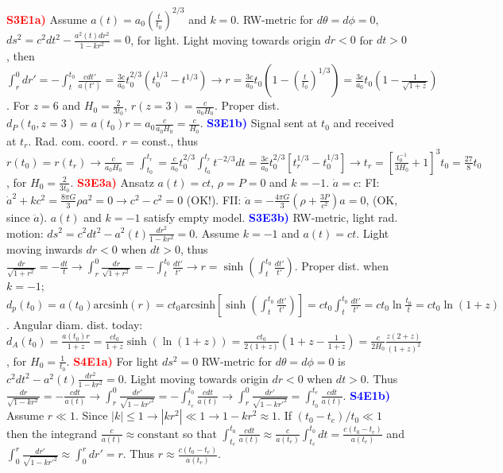 \documentclass[landscape, a4paper,1pt,english]{article}
\begin{document}
{{{\begin{multicols}{5}
\textcolor{red}{\textbf{S3E1a)}} Assume $a(t) = a_0 \left(\frac{t}{t_0}\right)^{2/3}$ and $k=0$. RW-metric for $d\theta = d\phi = 0$, $ds^2 = c^2dt^2 -\frac{a^2(t)dr^2}{1-kr^2} = 0$, for light. Light moving towards origin $dr<0$ for $dt >0$, then $\int_{r}^{0}dr' = -\int_{t}^{t_0}\frac{cdt'}{a(t')} = \frac{3c}{a_0}t_0^{2/3}(t_0^{1/3} - t^{1/3}) \rightarrow r = \frac{3c}{a_0}t_0\left(1-\left(\frac{t}{t_0}\right)^{1/3}\right) = \frac{3c}{a_0}t_0(1-\frac{1}{\sqrt{1+z}})  $. For $z = 6$ and $H_0  = \frac{2}{3t_0}$, $r(z = 3) = \frac{c}{a_0H_0}$. Proper dist. $d_P(t_0,z=3) = a(t_0)r = a_0\frac{c}{a_0H_0} = \frac{c}{H_0}$.
\textcolor{blue}{\textbf{S3E1b)}} Signal sent at $t_0$ and received at $t_r$. Rad. com. coord. $r=\text{const.}$, thus $r(t_0) = r(t_r)\rightarrow\frac{c}{a_0H_0} = \int_{t_0}^{t_r} = \frac{c}{a_0}t_0^{2/3}\int_{t_0}^{t_r}t^{-2/3}dt = \frac{3c}{a_0}t_0^{2/3}[t_r^{1/3} - t_0^{1/3}]\rightarrow t_r = \left[\frac{t_0^{-1}}{3H_0}+1\right]^3t_0 = \frac{27}{8}t_0$, for $H_0 = \frac{2}{3t_0}$.
\textcolor{red}{\textbf{S3E3a)}} Ansatz $a(t)=ct$, $\rho = P = 0$ and $k=-1$. $\dot{a} = c$: FI: $\dot{a}^2 + kc^2 = \frac{8\pi G}{3}\rho a^2 = 0\rightarrow c^2-c^2 = 0$ (OK!). FII: $\ddot{a} = -\frac{4\pi G}{3}(\rho+\frac{3P}{c^2})a = 0$, (OK, since $\ddot{a}$). $a(t)$ and $k=-1$ satisfy empty model.
\textcolor{blue}{\textbf{S3E3b)}} RW-metric, light rad. motion: $ds^2 = c^2dt^2 - a^2(t)\frac{dr^2}{1-kr^2}=0$. Assume $k=-1$ and $a(t) = ct$. Light moving inwards $dr<0$ when $dt>0$, thus $\frac{dr}{\sqrt{1+r^2}} = -\frac{dt}{t}\rightarrow \int_{r}^{0}\frac{dr}{\sqrt{1+r^2}} = -\int_{t}^{t_0}\frac{dt'}{t'} \rightarrow r = \sinh(\int_{t}^{t_0}\frac{dt'}{t'})$. Proper dist. when $k=-1$; $d_p(t_0) = a(t_0)\text{arcsinh}(r) = ct_0\text{arcsinh}\left[\sinh\left(\int_{t}^{t_0}\frac{dt'}{t'}\right)\right] = ct_0\int_{t}^{t_0}\frac{dt'}{t'} = ct_0\ln\frac{t_0}{t} = ct_0\ln(1+z)$. Angular diam. dist. today: $d_A(t_0) = \frac{a(t_0)r}{1+z} = \frac{ct_0}{1+z}\sinh(\ln(1+z)) = \frac{ct_0}{2(1+z)}\left(1+z - \frac{1}{1+z}\right) = \frac{c}{2H_0}\frac{z(2+z)}{(1+z)^2}$, for $H_0 = \frac{1}{t_0}$.
\textcolor{red}{\textbf{S4E1a)}} For light $ds^2 = 0$ RW-metric for $d\theta = d\phi = 0$ is $c^2dt^2 - a^2(t)\frac{dr^2}{1-kr^2} = 0$. Light moving towards origin $dr<0$ when $dt>0$. Thus $\frac{dr}{\sqrt{1-kr^2}} = -\frac{cdt}{a(t)}\rightarrow \int_{r}^{0}\frac{dr'}{\sqrt{1-kr'^2}} = -\int_{t_e}^{t_0}\frac{cdt}{a(t)}\rightarrow\int_{r}^{0}\frac{dr'}{\sqrt{1-kr'^2}} = \int_{t_0}^{t_e}\frac{cdt}{a(t)}$.
\textcolor{blue}{\textbf{S4E1b)}} Assume $r\ll1$. Since $|k|\leq 1\rightarrow |kr^2|\ll1\rightarrow 1-kr^2\approx 1$. If $(t_0-t_e)/t_0\ll1$ then the integrand $\frac{c}{a(t)}\approx\text{constant}$ so that $\int_{t_e}^{t_0}\frac{cdt}{a(t)}\approx\frac{c}{a(t_e)}\int_{t_e}^{t_0}dt = \frac{c(t_0-t_e)}{a(t_e)}$ and $\int_{0}^{r}\frac{dr'}{\sqrt{1-kr'^2}} \approx \int_{0}^{r}dr' = r$. Thus $r\approx\frac{c(t_0-t_e)}{a(t_e)}$.

\end{multicols}}}}
\end{document}
